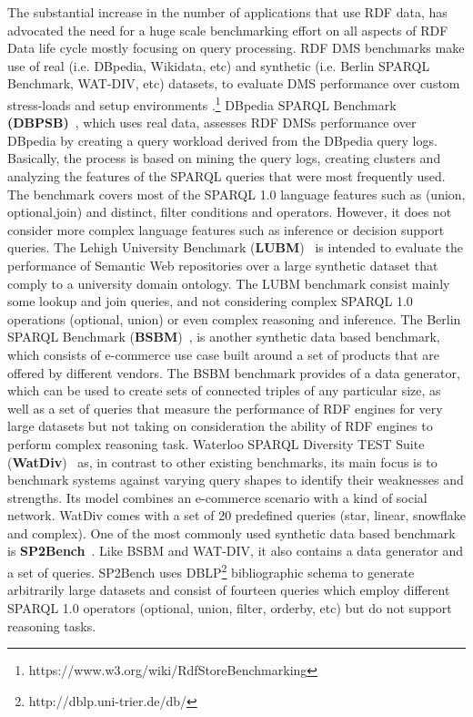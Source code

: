 \documentclass{llncs}
\begin{document}
    The substantial increase in the number of applications that use RDF data, has advocated the need for a huge scale benchmarking effort on all aspects of RDF Data life cycle mostly focusing on query processing\cite{ngomo2016hobbit}.
    RDF DMS benchmarks make use of real (i.e. DBpedia, Wikidata, etc) and synthetic (i.e. Berlin SPARQL Benchmark, WAT-DIV, etc) datasets, to evaluate DMS performance over custom stress-loads and setup environments \cite{fineeval}.\footnote{https://www.w3.org/wiki/RdfStoreBenchmarking}
    DBpedia SPARQL Benchmark \textbf{(DBPSB)}~\cite{Morsey2011}, which uses real data, assesses RDF DMSs performance over DBpedia by creating a query workload derived from the DBpedia query logs. Basically, the process is based on mining the query logs, creating clusters and analyzing the features of the SPARQL queries that were most frequently used. The benchmark covers most of the SPARQL 1.0 language features such as (union, optional,join) and distinct, filter conditions and operators. However, it does not consider more complex language features such as inference or decision support queries.
    The Lehigh University Benchmark (\textbf{LUBM})~\cite{Guo:2005:LBO:1741305.1741322} is intended to evaluate the performance of Semantic Web repositories over a large synthetic dataset that comply to a university domain ontology.
    The LUBM benchmark consist mainly some lookup and join queries, and not considering complex SPARQL 1.0 operations (optional, union) or even complex reasoning and inference.
    The Berlin SPARQL Benchmark (\textbf{BSBM})~\cite{Bizer2009TheBS}, is another synthetic data based benchmark, which consists of e-commerce use case built around a set of products that are offered by different vendors.
    The BSBM benchmark provides of a data generator, which can be used to create sets of connected triples of any particular size, as well as a set of queries that measure the performance of RDF engines for very large datasets but not taking on consideration the ability of RDF engines to perform complex reasoning task.
    Waterloo SPARQL Diversity TEST Suite (\textbf{WatDiv})~\cite{alucc2014diversified} as, in contrast to other existing benchmarks, its main focus is to benchmark systems against varying query shapes to identify their weaknesses and strengths.
    Its model combines an e-commerce scenario with a kind of social network.
    WatDiv comes with a set of 20 predefined queries (star, linear, snowflake and complex). 
    One of the most commonly used synthetic data based benchmark is \textbf{SP2Bench}~\cite{books/sp/virgilio09/SchmidtHMPL09}. Like BSBM and WAT-DIV, it also contains a data generator and a set of queries. SP2Bench uses DBLP\footnote{http://dblp.uni-trier.de/db/} bibliographic schema to generate arbitrarily large datasets and consist of fourteen queries which employ different SPARQL 1.0 operators (optional, union, filter, orderby, etc) but do not support reasoning tasks.
   
\end{document}
